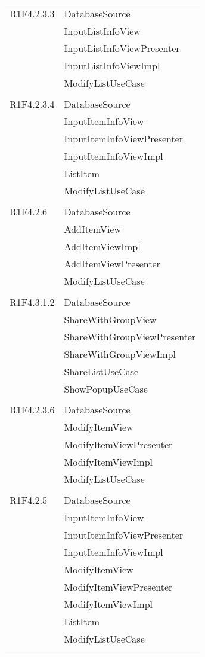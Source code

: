 \begin{center}
\begin{longtable}{|p{7cm}|p{7cm}|}
		R1F4.2.3.3 & DatabaseSource \\ & InputListInfoView \\ & InputListInfoViewPresenter \\ & InputListInfoViewImpl \\ & ModifyListUseCase \\ & \\ \hline
		R1F4.2.3.4 & DatabaseSource \\ & InputItemInfoView \\ & InputItemInfoViewPresenter \\ & InputItemInfoViewImpl \\ & ListItem \\ & ModifyListUseCase \\ & \\ \hline
		R1F4.2.6 & DatabaseSource \\ & AddItemView \\ & AddItemViewImpl \\ & AddItemViewPresenter \\ & ModifyListUseCase \\ & \\ \hline
		R1F4.3.1.2 & DatabaseSource \\ & ShareWithGroupView \\ & ShareWithGroupViewPresenter \\ & ShareWithGroupViewImpl \\ & ShareListUseCase \\ & ShowPopupUseCase \\ & \\ \hline
		R1F4.2.3.6 & DatabaseSource \\ & ModifyItemView \\ & ModifyItemViewPresenter \\ & ModifyItemViewImpl \\ & ModifyListUseCase \\ & \\ \hline
		R1F4.2.5 & DatabaseSource \\ & InputItemInfoView \\ & InputItemInfoViewPresenter \\ & InputItemInfoViewImpl \\ & ModifyItemView \\ & ModifyItemViewPresenter \\ & ModifyItemViewImpl \\ & ListItem \\ & ModifyListUseCase \\ & \\ \hline

\end{longtable}
\end{center}

